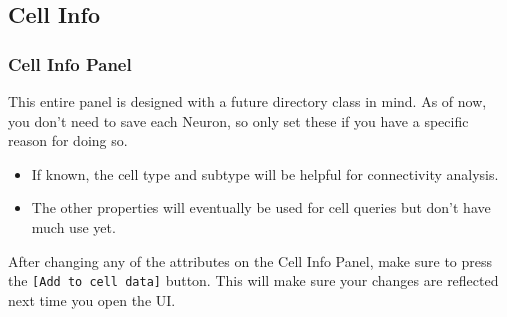 \documentclass[11pt]{beamer}
\begin{document}
\subsection{Cell Info}
	\begin{frame}
		\frametitle{Cell Info Panel}
		This entire panel is designed with a future directory class in mind. As of now, you don't need to save each Neuron, so only set these if you have a specific reason for doing so.
		\begin{itemize}
			\item If known, the cell type and subtype will be helpful for connectivity analysis.
			\item The other properties will eventually be used for cell queries but don't have much use yet.
		\end{itemize}
			After changing any of the attributes on the Cell Info Panel, make sure to press the \texttt{[Add to cell data]} button. This will make sure your changes are reflected next time you open the UI.\\
	\end{frame}
\end{document}

